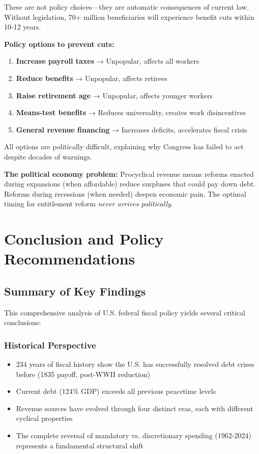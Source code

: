 \documentclass[12pt,letterpaper]{article}
\begin{document}
These are not policy choices—they are automatic consequences of current law. Without legislation, 70+ million beneficiaries will experience benefit cuts within 10-12 years.

\textbf{Policy options to prevent cuts:}
\begin{enumerate}
    \item \textbf{Increase payroll taxes} → Unpopular, affects all workers
    \item \textbf{Reduce benefits} → Unpopular, affects retirees
    \item \textbf{Raise retirement age} → Unpopular, affects younger workers
    \item \textbf{Means-test benefits} → Reduces universality, creates work disincentives
    \item \textbf{General revenue financing} → Increases deficits, accelerates fiscal crisis
\end{enumerate}

All options are politically difficult, explaining why Congress has failed to act despite decades of warnings.

\textbf{The political economy problem:} Procyclical revenue means reforms enacted during expansions (when affordable) reduce surpluses that could pay down debt. Reforms during recessions (when needed) deepen economic pain. The optimal timing for entitlement reform \textit{never arrives politically}.

\newpage

\section{Conclusion and Policy Recommendations}

\subsection{Summary of Key Findings}

This comprehensive analysis of U.S. federal fiscal policy yields several critical conclusions:

\subsubsection{Historical Perspective}

\begin{itemize}
    \item 234 years of fiscal history show the U.S. has successfully resolved debt crises before (1835 payoff, post-WWII reduction)
    \item Current debt (124\% GDP) exceeds all previous peacetime levels
    \item Revenue sources have evolved through four distinct eras, each with different cyclical properties
    \item The complete reversal of mandatory vs. discretionary spending (1962-2024) represents a fundamental structural shift
\end{itemize}
\end{document}
